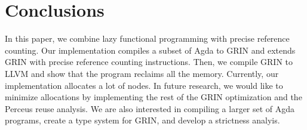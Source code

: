 \documentclass[9pt, twocolumn]{article}
\begin{document}


\section{Conclusions}
In this paper, we combine lazy functional programming with precise reference counting.
Our implementation compiles a subset of Agda to GRIN and extends GRIN with precise reference counting instructions. 
Then, we compile GRIN to LLVM and show that the program reclaims all the memory.
Currently, our implementation allocates a lot of nodes. 
In future research, we would like to minimize allocations by implementing the rest of the GRIN optimization and the Perceus reuse analysis.
We are also interested in compiling a larger set of Agda programs, create a type system for GRIN, and develop a strictness analyis.
\end{document}
